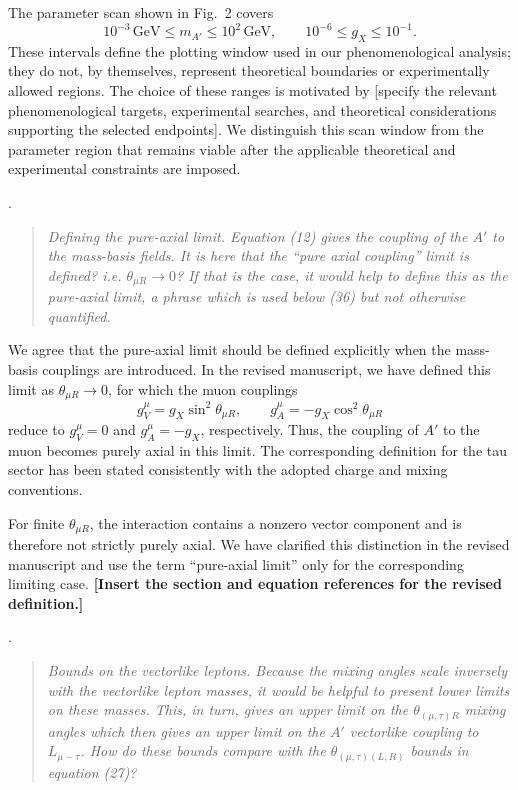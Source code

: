 \documentclass[12pt,a4paper]{article}
\begin{document}
The parameter scan shown in Fig.~2 covers
\[
10^{-3}\,\mathrm{GeV}\leq m_{A'}\leq10^2\,\mathrm{GeV},
\qquad
10^{-6}\leq g_X\leq10^{-1}.
\]
These intervals define the plotting window used in our phenomenological analysis; they do not, by themselves, represent theoretical boundaries or experimentally allowed regions. The choice of these ranges is motivated by [specify the relevant phenomenological targets, experimental searches, and theoretical considerations supporting the selected endpoints]. We distinguish this scan window from the parameter region that remains viable after the applicable theoretical and experimental constraints are imposed.

\medskip
{}.
\begin{quote}\itshape
Defining the pure-axial limit. Equation (12) gives the coupling of the \(A'\) to the mass-basis fields. It is here that the ``pure axial coupling'' limit is defined? i.e. \(\theta_{\mu R}\to0\)? If that is the case, it would help to define this as the pure-axial limit, a phrase which is used below (36) but not otherwise quantified.
\end{quote}


We agree that the pure-axial limit should be defined explicitly when the mass-basis couplings are introduced. In the revised manuscript, we have defined this limit as \(\theta_{\mu R}\to0\), for which the muon couplings
\[
g_V^\mu=g_X\sin^2\theta_{\mu R},
\qquad
g_A^\mu=-g_X\cos^2\theta_{\mu R}
\]
reduce to \(g_V^\mu=0\) and \(g_A^\mu=-g_X\), respectively. Thus, the coupling of \(A'\) to the muon becomes purely axial in this limit. The corresponding definition for the tau sector has been stated consistently with the adopted charge and mixing conventions.

For finite \(\theta_{\mu R}\), the interaction contains a nonzero vector component and is therefore not strictly purely axial. We have clarified this distinction in the revised manuscript and use the term ``pure-axial limit'' only for the corresponding limiting case. \textbf{[Insert the section and equation references for the revised definition.]}

\medskip
{}.
\begin{quote}\itshape
Bounds on the vectorlike leptons. Because the mixing angles scale inversely with the vectorlike lepton masses, it would be helpful to present lower limits on these masses. This, in turn, gives an upper limit on the \(\theta_{(\mu,\tau)R}\) mixing angles which then gives an upper limit on the \(A'\) vectorlike coupling to \(L_{\mu-\tau}\). How do these bounds compare with the \(\theta_{(\mu,\tau)(L,R)}\) bounds in equation (27)?
\end{quote}
\end{document}
